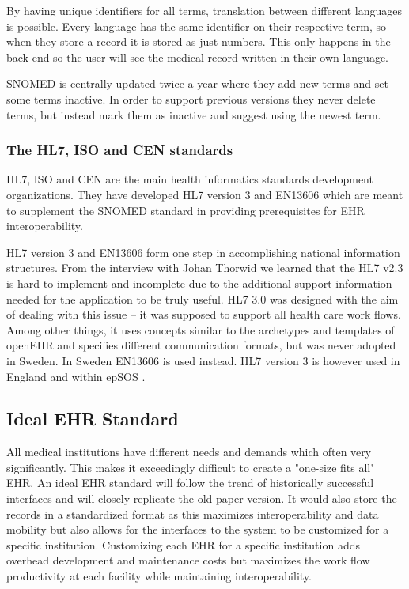\documentclass[14pt]{article}
\begin{document}
By having unique identifiers for all terms, translation between different languages is possible. Every language has the same identifier on their respective term, so when they store a record it is stored as just numbers. This only happens in the back-end so the user will see the medical record written in their own language.

\gls{SNOMED} is centrally updated twice a year where they add new terms and set some terms inactive. In order to support previous versions they never delete terms, but instead mark them as inactive and suggest using the newest term.\cite{annavik}

\subsubsection{The HL7, ISO and CEN standards}
\gls{HL7}, \gls{ISO} and \gls{CEN} are the main health informatics standards development organizations. They have developed \gls{HL7} version 3 and \gls{EN13606} which are meant to supplement the \gls{SNOMED} standard in providing prerequisites for \gls{EHR} \gls{interoperability}.

\gls{HL7} version 3 and \gls{EN13606} form one step in accomplishing national information structures. From the interview with Johan Thorwid \cite{Cambio} we learned that the \gls{HL7} v2.3 is hard to implement and incomplete due to the additional support information needed for the application to be truly useful. \gls{HL7} 3.0 was designed with the aim of dealing with this issue – it was supposed to support all health care work flows. Among other things, it uses concepts similar to the archetypes and templates of \gls{openEHR} and specifies different communication formats, but was never adopted in Sweden. In Sweden \gls{EN13606} is used instead. \gls{HL7} version 3 is however used in England \cite{Cambio} and within epSOS \cite{epSOS}.

\subsection{Ideal EHR Standard}
All medical institutions have different needs and demands which often very significantly. This makes it exceedingly difficult to create a "one-size fits all" \gls{EHR}. An ideal \gls{EHR} standard will follow the trend of historically successful interfaces and will closely replicate the old paper version. It would also store the records in a standardized format as this maximizes interoperability and data mobility but also allows for the interfaces to the system to be customized for a specific institution. Customizing each \gls{EHR} for a specific institution adds overhead development and maintenance costs but maximizes the work flow productivity at each facility while maintaining interoperability. 
\end{document}
